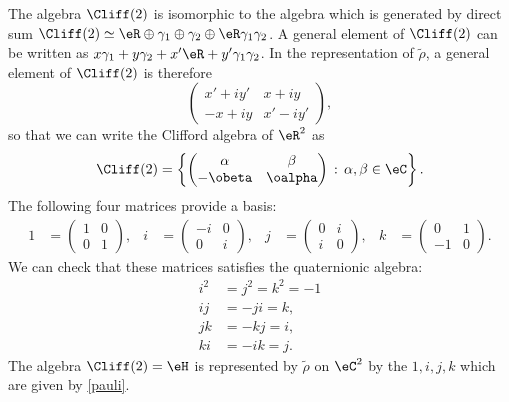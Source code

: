 The algebra $\Cliff(2)$ is isomorphic to the algebra which is generated by direct sum $\Cliff(2)\simeq\eR\oplus\gamma_1\oplus\gamma_2\oplus\eR\gamma_1\gamma_2$. A general element of $\Cliff(2)$ can be written as $x\gamma_1+y\gamma_2+x'\eR+y'\gamma_1\gamma_2$. In the representation of $\tilde\rho$, a general element of $\Cliff(2)$ is therefore
\[\begin{pmatrix}
		x'+iy' & x+iy   \\
		-x+iy  & x'-iy'
	\end{pmatrix},\] so that we can write the Clifford algebra of $\eR^2$ as
\[
	\Cliff(2)=\left\{\begin{pmatrix}
		\alpha  & \beta   \\
		-\obeta & \oalpha
	\end{pmatrix}\,:\,\alpha,\beta\in\eC\right\}.
\]
The following four matrices provide a basis:
\begin{align}\label{pauli}
	1 & =\begin{pmatrix}
		     1 & 0 \\
		     0 & 1
	     \end{pmatrix}, & i & =\begin{pmatrix}
		                           -i & 0 \\
		                           0  & i
	                           \end{pmatrix}, & j & =\begin{pmatrix}
		                                                 0 & i \\
		                                                 i & 0
	                                                 \end{pmatrix}, & k & =\begin{pmatrix}
		                                                                       0  & 1 \\
		                                                                       -1 & 0
	                                                                       \end{pmatrix}.
\end{align}
We can check that these matrices satisfies the quaternionic algebra:
\begin{equation}
	\begin{split}
		i^2&=j^2=k^2=-1\\
		ij &=-ji=k,\\
		jk &=-kj=i,\\
		ki &=-ik=j.
	\end{split}
\end{equation}
The algebra $\Cliff(2)=\eH$ is represented by $\tilde\rho$ on $\eC^2$ by the  $1,i,j,k$ which are given by \eqref{pauli}.

